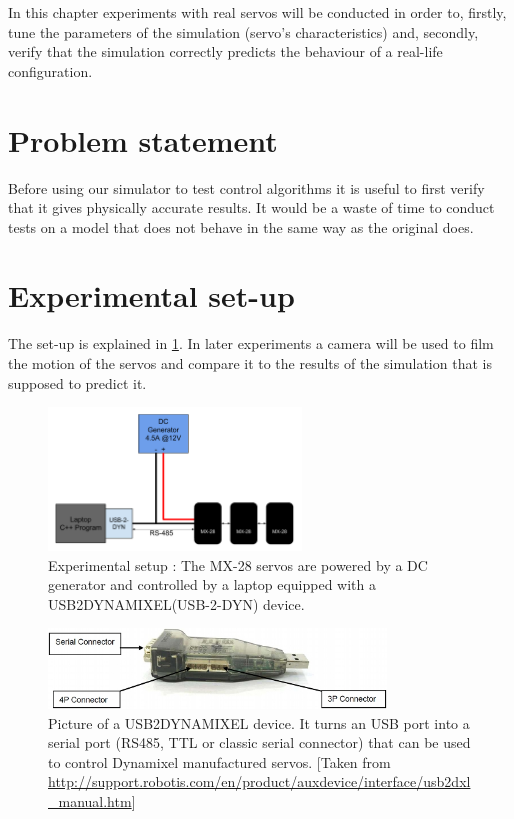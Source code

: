 In this chapter experiments with real servos will be conducted in order to, firstly, tune the parameters of the simulation (servo's characteristics) and, secondly, verify that the simulation correctly predicts the behaviour of a real-life configuration.

\section{Problem statement}
Before using our simulator to test control algorithms it is useful to first verify that it gives physically accurate results. It would be a waste of time to conduct tests on a model that does not behave in the same way as the original does.

\section{Experimental set-up}
The set-up is explained in \cref{fig:exp_setup}. In later experiments a camera will be used to film the motion of the servos and compare it to the results of the simulation that is supposed to predict it.

\begin{figure}[htp]
\center
\includegraphics[width=0.6\textwidth]{figures/exp_setup}
\caption[Experimental setup]{Experimental setup : The MX-28 servos are powered by a DC generator and controlled by a laptop equipped with a USB2DYNAMIXEL(USB-2-DYN) device.}
\label{fig:exp_setup}
\end{figure}

\begin{figure}[htp]
\center
    \includegraphics[width = 0.8\textwidth]{figures/u2d}
    \caption[USB2DYNAMIXEL]{Picture of a USB2DYNAMIXEL device. It turns an USB port into a serial port (RS485, TTL or classic serial connector) that can be used to control Dynamixel manufactured servos. [Taken from \url{http://support.robotis.com/en/product/auxdevice/interface/usb2dxl_manual.htm}]}
    \label{fig:usb2dyn}
\end{figure}

